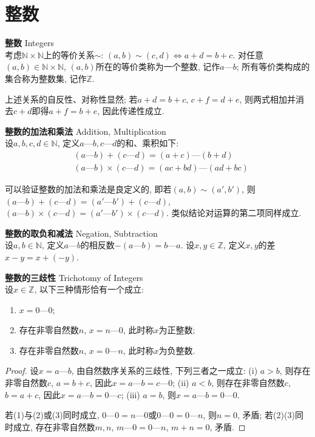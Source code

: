 
\section{整数}

\begin{dfn}\textbf{整数} Integers\\
考虑$\mathbb{N}\times \mathbb{N}$上的等价关系$\sim$: $(a,b)\sim(c,d)\iff a+d=b+c$. 对任意$(a,b)\in \mathbb{N}\times \mathbb{N}$, $(a,b)$所在的等价类称为一个整数, 记作$a—b$; 所有等价类构成的集合称为整数集, 记作$\mathbb{Z}$. 
\end{dfn}
上述关系的自反性、对称性显然; 若$a+d=b+c$, $c+f=d+e$, 则两式相加并消去$c+d$即得$a+f=b+e$, 因此传递性成立. 

\begin{dfn}\textbf{整数的加法和乘法} Addition, Multiplication\\
设$a,b,c,d \in \mathbb{N}$, 定义$a—b, c—d$的和、乘积如下:
\begin{align}
    &(a—b)+(c—d)=(a+c)—(b+d)\\
    &(a—b)\times (c—d)=(ac+bd)—(ad+bc)
\end{align}
\end{dfn}
\par 可以验证整数的加法和乘法是良定义的, 即若$(a,b)\sim (a',b')$, 则$(a—b)+(c—d)=(a'—b')+(c—d)$, $(a—b)\times (c—d)=(a'—b')\times (c—d)$. 类似结论对运算的第二项同样成立. 

\begin{dfn}\textbf{整数的取负和减法} Negation, Subtraction\\
设$a,b\in \mathbb{N}$, 定义$a—b$的相反数$-(a—b)=b—a$. 设$x,y\in \mathbb{Z}$, 定义$x,y$的差$x-y=x+(-y)$. 
\end{dfn}

\begin{pro}\textbf{整数的三歧性} Trichotomy of Integers\\
设$x\in \mathbb{Z}$, 以下三种情形恰有一个成立:
\begin{enumerate}
    \item $x=0—0$;
    \item 存在非零自然数$n$, $x=n—0$, 此时称$x$为正整数;
    \item 存在非零自然数$n$, $x=0—n$, 此时称$x$为负整数.
\end{enumerate}
\end{pro}
\begin{proof}
\par 设$x=a—b$, 由自然数序关系的三歧性, 下列三者之一成立: (i) $a>b$, 则存在非零自然数$c$, $a=b+c$, 因此$x=a—b=c—0$; (ii) $a<b$, 则存在非零自然数$c$, $b=a+c$, 因此$x=a—b=0—c$; (iii) $a=b$, 则$x=a—b=0—0$. 
\par 若(1)与(2)或(3)同时成立, $0—0=n—0$或$0—0=0—n$, 则$n=0$, 矛盾; 若(2)(3)同时成立, 存在非零自然数$m,n$, $m—0=0—n$, $m+n=0$, 矛盾.
\end{proof}


